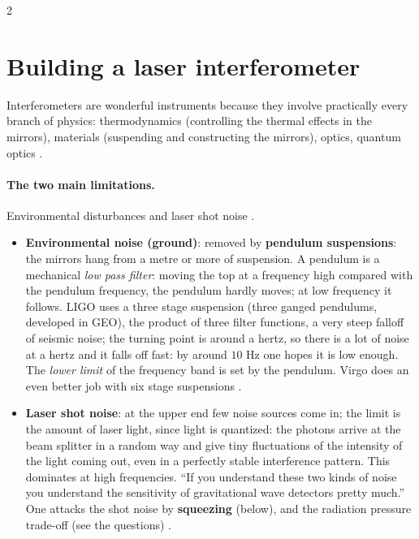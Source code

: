 \begin{paracol}{2}
\section{Building a laser interferometer}\label{sec:c28-building}

Interferometers are wonderful instruments because they involve practically every branch of physics: thermodynamics (controlling the thermal effects in the mirrors), materials (suspending and constructing the mirrors), optics, quantum optics .

\paragraph{The two main limitations.} Environmental disturbances and laser shot noise .
\begin{itemize}
  \item \textbf{Environmental noise (ground)}: removed by \textbf{pendulum suspensions}: the mirrors hang from a metre or more of suspension. A pendulum is a mechanical \emph{low pass filter}: moving the top at a frequency high compared with the pendulum frequency, the pendulum hardly moves; at low frequency it follows. LIGO uses a three stage suspension (three ganged pendulums, developed in GEO), the product of three filter functions, a very steep falloff of seismic noise; the turning point is around a hertz, so there is a lot of noise at a hertz and it falls off fast: by around $10$ Hz one hopes it is low enough. The \emph{lower limit} of the frequency band is set by the pendulum. Virgo does an even better job with six stage suspensions .
  \item \textbf{Laser shot noise}: at the upper end few noise sources come in; the limit is the amount of laser light, since light is quantized: the photons arrive at the beam splitter in a random way and give tiny fluctuations of the intensity of the light coming out, even in a perfectly stable interference pattern. This dominates at high frequencies. ``If you understand these two kinds of noise you understand the sensitivity of gravitational wave detectors pretty much.'' One attacks the shot noise by \textbf{squeezing} (below), and the radiation pressure trade-off (see the questions) .
\end{itemize}


\end{paracol}
